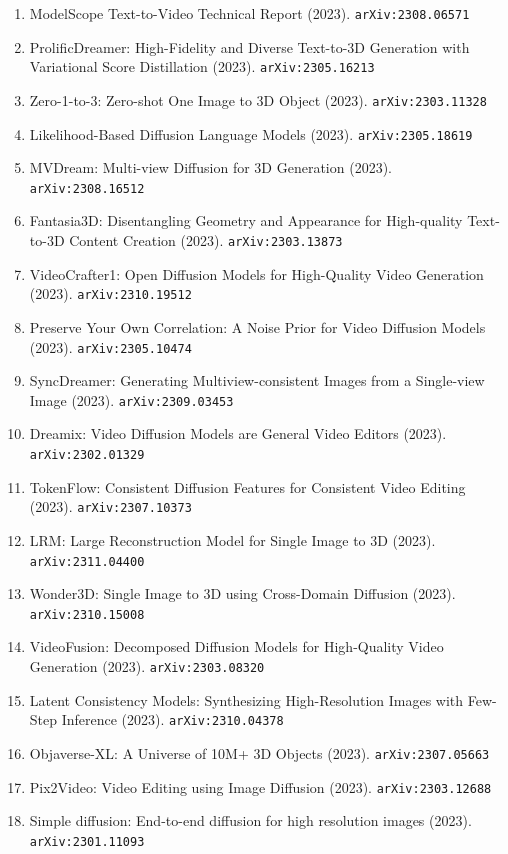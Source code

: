 \documentclass[11pt]{article}
\begin{document}
\begin{enumerate}
  \item ModelScope Text-to-Video Technical Report (2023). \texttt{arXiv:2308.06571}
  \item ProlificDreamer: High-Fidelity and Diverse Text-to-3D Generation with
  Variational Score Distillation (2023). \texttt{arXiv:2305.16213}
  \item Zero-1-to-3: Zero-shot One Image to 3D Object (2023). \texttt{arXiv:2303.11328}
  \item Likelihood-Based Diffusion Language Models (2023). \texttt{arXiv:2305.18619}
  \item MVDream: Multi-view Diffusion for 3D Generation (2023). \texttt{arXiv:2308.16512}
  \item Fantasia3D: Disentangling Geometry and Appearance for High-quality
  Text-to-3D Content Creation (2023). \texttt{arXiv:2303.13873}
  \item VideoCrafter1: Open Diffusion Models for High-Quality Video Generation (2023). \texttt{arXiv:2310.19512}
  \item Preserve Your Own Correlation: A Noise Prior for Video Diffusion Models (2023). \texttt{arXiv:2305.10474}
  \item SyncDreamer: Generating Multiview-consistent Images from a Single-view
  Image (2023). \texttt{arXiv:2309.03453}
  \item Dreamix: Video Diffusion Models are General Video Editors (2023). \texttt{arXiv:2302.01329}
  \item TokenFlow: Consistent Diffusion Features for Consistent Video Editing (2023). \texttt{arXiv:2307.10373}
  \item LRM: Large Reconstruction Model for Single Image to 3D (2023). \texttt{arXiv:2311.04400}
  \item Wonder3D: Single Image to 3D using Cross-Domain Diffusion (2023). \texttt{arXiv:2310.15008}
  \item VideoFusion: Decomposed Diffusion Models for High-Quality Video
  Generation (2023). \texttt{arXiv:2303.08320}
  \item Latent Consistency Models: Synthesizing High-Resolution Images with
  Few-Step Inference (2023). \texttt{arXiv:2310.04378}
  \item Objaverse-XL: A Universe of 10M+ 3D Objects (2023). \texttt{arXiv:2307.05663}
  \item Pix2Video: Video Editing using Image Diffusion (2023). \texttt{arXiv:2303.12688}
  \item Simple diffusion: End-to-end diffusion for high resolution images (2023). \texttt{arXiv:2301.11093}

\end{enumerate}
\end{document}
